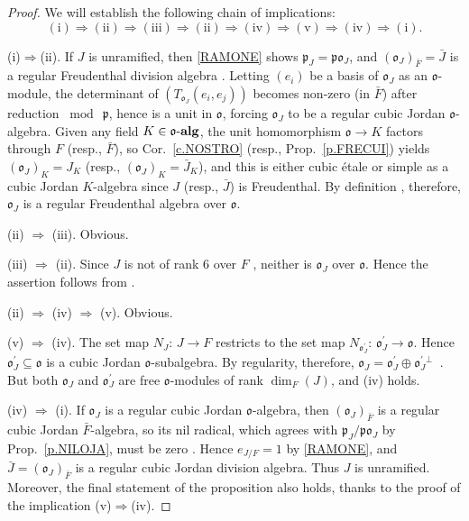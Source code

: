 \documentclass{amsart}
\theoremstyle{definition} %
\theoremstyle{remark} %
\newcommand{\oalg}{\mfo\mathchar45\mathbf{alg}}
\newcommand{\mfo}{\mathfrak{o}}
\newcommand{\mfp}{\mathfrak{p}}
\renewcommand{\:}{\colon\,}
\numberwithin{equation}{section}
\begin{document}
\begin{proof}
We will establish the following chain of implications:
\[
(\mathrm{i}) \Rightarrow (\mathrm{ii}) \Rightarrow (\mathrm{iii}) \Rightarrow (\mathrm{ii}) \Rightarrow (\mathrm{iv}) \Rightarrow (\mathrm{v}) \Rightarrow (\mathrm{iv}) \Rightarrow (\mathrm{i}) .
\] 

(i)$\Rightarrow$(ii). If $J$ is unramified, then \eqref{RAMONE} shows $\mfp_J= \mfp\mfo_J$, and $(\mfo_J)_{\bar F} = \bar J$ is a regular Freudenthal division algebra \cite[Thm.~46.8]{MR4806163}. Letting $(e_i)$ be a basis of $\mfo_J$ as an $\mfo$-module, the determinant of $(T_{\mfo_J}(e_i,e_j))$ becomes non-zero (in $\bar F$) after reduction $\bmod~\mfp$, hence is a unit in $\mfo$, forcing $\mfo_J$ to be a regular cubic Jordan $\mfo$-algebra. Given any field $K \in \oalg$, the unit homomorphism $\mfo \to K$ factors through $F$ (resp., $\bar F$), so Cor.~\ref{c.NOSTRO} (resp., Prop.~\ref{p.FRECUI}) yields $(\mfo_J)_K = J_K$ (resp., $(\mfo_J)_K =\bar J_K$), and this is either cubic \'etale or simple as a cubic Jordan $K$-algebra since $J$ (resp., $\bar J$) is Freudenthal. By definition \cite[39.8]{MR4806163}, therefore, $\mfo_J$ is a regular Freudenthal algebra over $\mfo$. 

(ii) $\Rightarrow$ (iii). Obvious.

(iii) $\Rightarrow$ (ii). Since $J$ is not of rank $6$ over $F$ \cite[Thm.~46.8]{MR4806163}, neither is $\mfo_J$ over $\mfo$. Hence the assertion follows from \cite[Cor.~39.15]{MR4806163}.

(ii) $\Rightarrow$ (iv) $\Rightarrow$ (v). Obvious.

(v) $\Rightarrow$ (iv). The set map $N_J\:J \to F$ restricts to the set map $N_{\mfo_J^\prime}\:\mfo_J^\prime \to \mfo$. Hence $\mfo_J^\prime \subseteq \mfo$ is a cubic Jordan $\mfo$-subalgebra. By regularity, therefore, $\mfo_J= \mfo_J^\prime \oplus \mfo_J^{\prime\perp}$ \cite[Lemma~11.10]{MR4806163}. But both $\mfo_J$ and $\mfo_J^\prime$ are free $\mfo$-modules of rank $\dim_F(J)$, and (iv) holds.	

(iv) $\Rightarrow$ (i). If $\mfo_J$ is a regular cubic Jordan $\mfo$-algebra, then $(\mfo_J)_{\bar F}$ is a regular cubic Jordan $\bar F$-algebra, so its nil radical, which agrees with $\mfp_J/\mfp\mfo_J$ by Prop.~\ref{p.NILOJA}, must be zero \cite[Exc.~34.23]{MR4806163}. Hence $e_{J/F} = 1$ by \eqref{RAMONE}, and $\bar J = (\mfo_J)_{\bar F}$ is a regular cubic Jordan division algebra. Thus $J$ is unramified. Moreover, the final statement of the proposition also holds, thanks to the proof of the implication (v)$\Rightarrow$(iv).
\end{proof}
\end{document}
